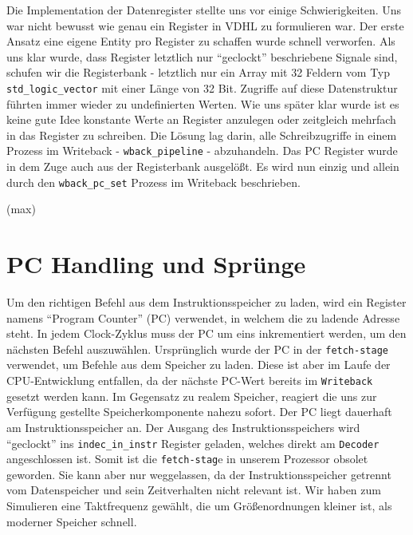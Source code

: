 \documentclass[paper=a4,fontsize=12pt,twocolumn]{scrreprt}
\begin{document}
Die Implementation der Datenregister stellte uns vor einige Schwierigkeiten.
Uns war nicht bewusst wie genau ein Register in VDHL zu formulieren war.
Der erste Ansatz eine eigene Entity pro Register zu schaffen wurde schnell verworfen.
Als uns klar wurde, dass Register letztlich nur \enquote{geclockt} beschriebene Signale sind, schufen wir die Registerbank - letztlich nur ein Array mit 32 Feldern vom  Typ \texttt{std\_logic\_vector} mit einer Länge von 32 Bit.
Zugriffe auf diese Datenstruktur führten immer wieder zu undefinierten Werten.
Wie uns später klar wurde ist es keine gute Idee konstante Werte an Register anzulegen oder zeitgleich mehrfach in das Register zu schreiben.
Die Lösung lag darin, alle Schreibzugriffe in einem Prozess im Writeback - \texttt{wback\_pipeline} - abzuhandeln.
Das PC Register wurde in dem Zuge auch aus der Registerbank ausgelößt. 
Es wird nun einzig und allein durch den \texttt{wback\_pc\_set} Prozess im Writeback beschrieben.

(max)

\section{PC Handling und Sprünge}
\label{sec:pc_handling_und_spruenge}

Um den richtigen Befehl aus dem Instruktionsspeicher zu laden, wird ein Register namens \enquote{Program Counter} (PC) verwendet, in welchem die zu ladende Adresse steht.
In jedem Clock-Zyklus muss der PC um eins inkrementiert werden, um den nächsten Befehl auszuwählen.
Ursprünglich wurde der PC in der \texttt{fetch-stage} verwendet, um Befehle aus dem Speicher zu laden.
Diese ist aber im Laufe der CPU-Entwicklung entfallen, da der nächste PC-Wert bereits im \texttt{Writeback} gesetzt werden kann.
Im Gegensatz zu realem Speicher, reagiert die uns zur Verfügung gestellte Speicherkomponente nahezu sofort.
Der PC liegt dauerhaft am Instruktionsspeicher an.
Der Ausgang des Instruktionsspeichers wird \enquote{geclockt} ins \texttt{indec\_in\_instr} Register geladen, welches direkt am \texttt{Decoder} angeschlossen ist.
Somit ist die \texttt{fetch-stag}e in unserem Prozessor obsolet geworden.
Sie kann aber nur weggelassen, da der Instruktionsspeicher getrennt vom Datenspeicher und sein Zeitverhalten nicht relevant ist.
Wir haben zum Simulieren eine Taktfrequenz gewählt, die um Größenordnungen kleiner ist, als moderner Speicher schnell.
\end{document}
